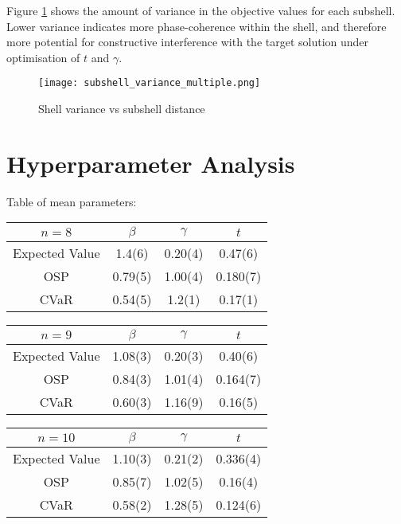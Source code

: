 Figure \ref{fig:shell variance} shows the amount of variance in the objective values for each subshell.
Lower variance indicates more phase-coherence within the shell, and therefore more potential for constructive interference with the target solution under optimisation of $t$ and $\gamma$.
\begin{figure}[htbp]
    \centering
    \texttt{[image: subshell\_variance\_multiple.png]}
    \caption{Shell variance vs subshell distance}
    \label{fig:shell variance}
\end{figure}

\section{Hyperparameter Analysis}
Table of mean parameters:

\begin{tabular}{c||c|c|c}
    $n=8$          & $\beta$ & $\gamma$ & $t$     \\\hline\hline
    Expected Value & 1.4(6)  & 0.20(4)  & 0.47(6) \\\hline
    OSP            & 0.79(5) & 1.00(4)  & 0.180(7)\\\hline
    CVaR           & 0.54(5) & 1.2(1)   & 0.17(1) 
\end{tabular}

\begin{tabular}{c|c|c|c}
    $n=9$          & $\beta$ & $\gamma$ & $t$     \\\hline
    Expected Value & 1.08(3) & 0.20(3)  & 0.40(6) \\\hline
    OSP            & 0.84(3) & 1.01(4)  & 0.164(7)\\\hline
    CVaR           & 0.60(3) & 1.16(9)  & 0.16(5) 
\end{tabular}

\begin{tabular}{c|c|c|c}
    $n=10$         & $\beta$ & $\gamma$ & $t$     \\\hline
    Expected Value & 1.10(3) & 0.21(2)  & 0.336(4)\\\hline
    OSP            & 0.85(7) & 1.02(5)  & 0.16(4) \\\hline
    CVaR           & 0.58(2) & 1.28(5)  & 0.124(6)
\end{tabular}
